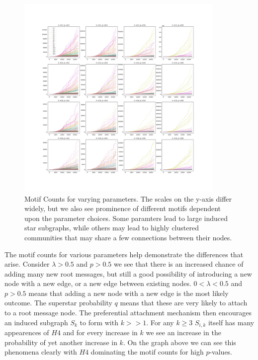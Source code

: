 \begin{figure}[h!]
    \includegraphics[width=10cm]{Images/full-sims-graph_mid_set.png}
    \centering
    \caption{Motif Counts for varying parameters. The scales on the y-axis differ widely,
    but we also see prominence of different motifs dependent upon the parameter choices. 
    Some paramters lead to large induced star subgraphs, while others may lead to 
    highly clustered communities that may share a few connections between their nodes.}
\end{figure}
\newpage

\vspace{3mm}

The motif counts for various parameters help demonstrate the differences that arise. 
Consider $\lambda>0.5$ and $p>0.5$ we see that there is an increased chance of adding
many new root messages, but still a good possibility of introducing a new node with a new edge,
or a new edge between existing nodes. $0<\lambda<0.5$ and $p>0.5$ means that adding a new node
with a new edge is the most likely outcome. The superstar probability $q$ means that these
are very likely to attach to a root message node. The preferential attachment mechanism then
encourages an induced subgraph $S_{k}$ to form with $k>>1$. For any $k\geq3$ $S_{i,k}$
itself has many appearences of $H4$ and for every increase in $k$ we see an increase in the probability
of yet another increase in $k$. On the graph above we can see this phenomena clearly with $H4$
dominating the motif counts for high $p$-values.

